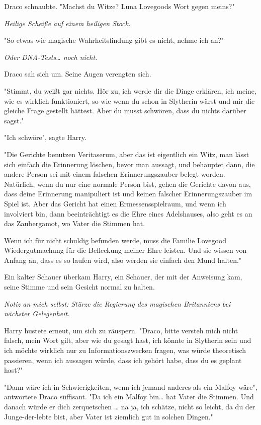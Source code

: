 {Draco schnaubte. "Machst du Witze? Luna Lovegoods Wort gegen meins?"

\emph{Heilige Scheiße auf einem heiligen Stock.}

"So etwas wie magische Wahrheitsfindung gibt es nicht, nehme ich an?"

\emph{Oder DNA-Tests… noch nicht.}

Draco sah sich um. Seine Augen verengten sich.

"Stimmt, du weißt gar nichts. Hör zu, ich werde dir die Dinge erklären, ich meine, wie es wirklich funktioniert, so wie wenn du schon in Slytherin wärst und mir die gleiche Frage gestellt hättest. Aber du musst schwören, dass du nichts darüber sagst."

"Ich schwöre", sagte Harry.

"Die Gerichte benutzen Veritaserum, aber das ist eigentlich ein Witz, man lässt sich einfach die Erinnerung löschen, bevor man aussagt, und behauptet dann, die andere Person sei mit einem falschen Erinnerungszauber belegt worden. Natürlich, wenn du nur eine normale Person bist, gehen die Gerichte davon aus, dass deine Erinnerung manipuliert ist und keinen falscher Erinnerungszauber im Spiel ist. Aber das Gericht hat einen Ermessensspielraum, und wenn ich involviert bin, dann beeinträchtigt es die Ehre eines Adelshauses, also geht es an das Zaubergamot, wo Vater die Stimmen hat.

Wenn ich für nicht schuldig befunden werde, muss die Familie Lovegood Wiedergutmachung für die Befleckung meiner Ehre leisten. Und sie wissen von Anfang an, dass es so laufen wird, also werden sie einfach den Mund halten."

Ein kalter Schauer überkam Harry, ein Schauer, der mit der Anweisung kam, seine Stimme und sein Gesicht normal zu halten.

\emph{Notiz an mich selbst: Stürze die Regierung des magischen Britanniens bei nächster Gelegenheit.}

Harry hustete erneut, um sich zu räuspern. "Draco, bitte versteh mich nicht falsch, mein Wort gilt, aber wie du gesagt hast, ich könnte in Slytherin sein und ich möchte wirklich nur zu Informationszwecken fragen, was würde theoretisch passieren, wenn ich aussagen würde, dass ich gehört habe, dass du es geplant hast?"

"Dann wäre ich in Schwierigkeiten, wenn ich jemand anderes als ein Malfoy wäre", antwortete Draco süffisant. "Da ich ein Malfoy bin… hat Vater die Stimmen. Und danach würde er dich zerquetschen … na ja, ich schätze, nicht so leicht, da du der Junge-der-lebte bist, aber Vater ist ziemlich gut in solchen Dingen."

}
